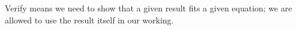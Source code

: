 Verify means we need to show that a given result
fits a given equation; we are allowed to use the
result itself in our working.
